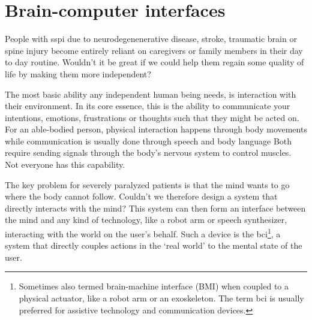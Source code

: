 
\chapter{Brain-computer interfaces}
\label{sec:bci}
People with \ac{sspi} due to
neurodegenenerative disease, stroke, traumatic brain or spine injury
become entirely reliant on caregivers or family members in their day to day
routine.
Wouldn't it be great if we could help them regain some quality of life by
making them more independent?

The most basic ability any independent human being needs, is interaction with
their environment.
In its core essence, this is the ability to communicate your intentions,
emotions, frustrations or thoughts such that they might be acted on.
For an able-bodied person, physical interaction happens through body movements
while communication is usually done through speech and body language
Both require sending signals through the body's nervous system to control
muscles.
Not everyone has this capability.

The key problem for severely paralyzed patients is that the mind wants to go
where the body cannot follow.
Couldn't we therefore design a system that directly interacts with the mind?
This system can then form an interface between the mind and any kind of
technology, like a robot arm or speech synthesizer, interacting with the world
on the user's behalf.
Such a device is the \ac{bci}\footnote{Sometimes also
termed brain-machine interface (BMI) when coupled to a physical actuator, like
a robot arm or an exoskeleton.
The term \ac{bci} is usually preferred for
assistive technology and communication devices.
},
a system that directly couples actions in the `real world' to the mental state of
the user.

